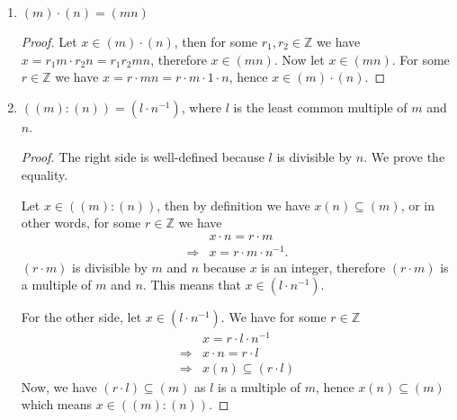 \documentclass[11pt]{scrartcl}
\begin{document}
\begin{enumerate}
\begin{proof}
        For the other inclusion, let \(x \in (d)\), then we have \(x = a \cdot d\) for some \(a \in \mathbb{Z}\). Moreover by B\'ezout's identity, we have \(d = r_1 \cdot m + r_2 \cdot n\) for some \( r_1, r_2 \in \mathbb{Z} \). Putting these together, we have
        \begin{align*}
            x &= a \cdot d \\
            & = a \cdot (r_1 \cdot m + r_2 \cdot n) \\
            & = a r_1 m + a r_2 n \text{.}
        \end{align*}
        Hence, \(x \in (m) + (n)\).
    \end{proof}
    \item \( (m) \cdot (n) = (mn) \)
    \begin{proof}
        Let \(x \in (m) \cdot (n)\), then for some \(r_1, r_2 \in \mathbb{Z}\) we have \(x = r_1 m \cdot r_2 n = r_1 r_2 m n\), therefore \(x \in (mn)\).
        Now let \(x \in (mn)\). For some \(r \in \mathbb{Z}\) we have \(x = r \cdot mn = r \cdot m \cdot 1 \cdot n\), hence \(x \in (m) \cdot (n)\).
    \end{proof}
    \item \(( (m) : (n) ) = (l \cdot n^{-1})\), where \(l\) is the least common multiple of \(m\) and \(n\).
    \begin{proof}
        The right side is well-defined because \(l\) is divisible by \(n\). We prove the equality.

        Let \(x \in ( (m) : (n) )\), then by definition we have \( x (n) \subseteq (m) \), or in other words, for some  \(r \in \mathbb{Z}\) we have
        \begin{align*}
            &x \cdot n = r \cdot m \\
            \Rightarrow &x = r \cdot m \cdot n^{-1} \text{.}
        \end{align*}
        \((r \cdot m)\) is divisible by \(m\) and \(n\) because \(x\) is an integer, therefore \((r \cdot m)\) is a multiple of \(m\) and \(n\). This means that \(x \in (l \cdot n^{-1})\).

        For the other side, let \(x \in (l \cdot n^{-1})\). We have for some \(r \in \mathbb{Z}\)
        \begin{align*}
            & x = r \cdot l \cdot n^{-1} \\
            \Rightarrow& x \cdot n = r \cdot l \\
            \Rightarrow& x (n) \subseteq (r \cdot l) 
        \end{align*}
        Now, we have \((r \cdot l) \subseteq (m)\) as \(l\) is a multiple of \(m\), hence \(x(n) \subseteq (m)\) which means \(x \in ( (m) : (n) )\).
    \end{proof}
\end{enumerate}
\end{document}

